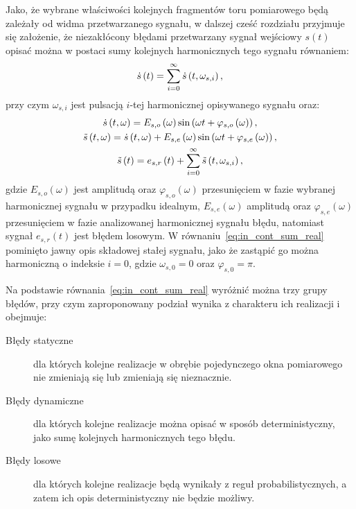 Jako, że wybrane właściwości kolejnych fragmentów toru pomiarowego będą zależały od widma przetwarzanego sygnału, w dalszej cześć rozdziału przyjmuje się założenie, że niezakłócony błędami przetwarzany sygnał wejściowy $s(t)$ opisać można w postaci sumy kolejnych harmonicznych tego sygnału równaniem:
\begin{equation}
\dot{s} \left(t\right) = \sum _{i = 0} ^{\infty} \dot{s} \left( t, \omega_{s,i} \right) \label{eq:in_cont_sum},
\end{equation}
przy czym $\omega_{s,i}$ jest pulsacją $i$-tej harmonicznej opisywanego sygnału oraz:
\begin{gather}
\dot{s} \left( t, \omega \right) = E_{s,o} \left(\omega\right) \sin \left( \omega t + \varphi_{s,o} \left(\omega\right) \right) \label{eq:in_cont_omega_ideal}, \\
\tilde{s} \left( t, \omega \right) = \dot{s} \left( t, \omega \right) + E_{s,e} \left(\omega\right) \sin \left( \omega t + \varphi_{s,e} \left(\omega\right) \right) \label{eq:in_cont_omega_real}, \\
\tilde{s} \left(t\right) = e_{s,r} \left(t\right) + \sum _{i = 0} ^{\infty} \tilde{s} \left( t, \omega_{s,i} \right) \label{eq:in_cont_sum_real},
\end{gather}
gdzie $E_{s,o}(\omega)$ jest amplitudą oraz $\varphi_{s,o}(\omega)$ przesunięciem w fazie wybranej harmonicznej sygnału w przypadku idealnym, $E_{s,e}(\omega)$ amplitudą oraz $ \varphi_{s,e}(\omega)$ przesunięciem w fazie analizowanej harmonicznej sygnału błędu, natomiast sygnał $e_{s,r}(t)$ jest błędem losowym. W równaniu~\eqref{eq:in_cont_sum_real} pominięto jawny opis składowej stałej sygnału, jako że zastąpić go można harmoniczną o indeksie $i = 0$, gdzie $\omega_{s,0} = 0$ oraz $\varphi_{s,0} = \pi$.

Na podstawie równania~\eqref{eq:in_cont_sum_real} wyróżnić można trzy grupy błędów, przy czym zaproponowany podział wynika z charakteru ich realizacji i obejmuje:
\begin{description}
\item [Błędy statyczne] dla których kolejne realizacje w obrębie pojedynczego okna pomiarowego nie zmieniają się lub zmieniają się nieznacznie.
\item [Błędy dynamiczne] dla których kolejne realizacje można opisać w sposób deterministyczny, jako sumę kolejnych harmonicznych tego błędu.
\item [Błędy losowe] dla których kolejne realizacje będą wynikały z reguł probabilistycznych, a zatem ich opis deterministyczny nie będzie możliwy.
\end{description}

